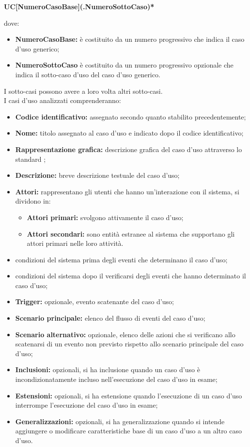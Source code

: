 \begin{center}
	\textbf{UC[NumeroCasoBase](.NumeroSottoCaso)*}
\end{center}
dove:
\begin{itemize}
	\item \textbf{NumeroCasoBase:} è costituito da un numero progressivo che indica il caso d'uso generico;
	\item \textbf{NumeroSottoCaso} è costituito da un numero progressivo opzionale che indica il sotto-caso d'uso del caso d'uso generico.
\end{itemize}  
I sotto-casi possono avere a loro volta altri sotto-casi.\\ 
I casi d'uso analizzati comprenderanno:
\begin{itemize}
	\item \textbf{Codice identificativo:} assegnato secondo quanto stabilito precedentemente;
	\item \textbf{Nome:} titolo assegnato al caso d'uso e indicato dopo il codice identificativo;
	\item \textbf{Rappresentazione grafica:} descrizione grafica del caso d'uso attraverso lo standard ;
	\item \textbf{Descrizione:} breve descrizione testuale del caso d'uso;
	\item \textbf{Attori:} rappresentano gli utenti che hanno un'interazione con il sistema, si dividono in:
	\begin{itemize}
		\item \textbf{Attori primari:} svolgono attivamente il caso d'uso;
		\item \textbf{Attori secondari:} sono entità estranee al sistema che supportano gli attori primari nelle loro attività.
	\end{itemize}
	\item {} condizioni del sistema prima degli eventi che determinano il caso d'uso;
	\item {} condizioni del sistema dopo il verificarsi degli eventi che hanno determinato il caso d'uso;
	\item \textbf{Trigger:} opzionale, evento scatenante del caso d'uso;
	\item \textbf{Scenario principale:} elenco del flusso di eventi del caso d'uso;
	\item \textbf{Scenario alternativo:} opzionale, elenco delle azioni che si verificano allo scatenarsi di un evento non previsto rispetto allo scenario principale del caso d'uso;
	\item \textbf{Inclusioni:} opzionali, si ha inclusione quando un caso d'uso è incondizionatamente incluso nell'esecuzione del caso d'uso in esame;
	\item \textbf{Estensioni:} opzionali, si ha estensione quando l'esecuzione di un caso d'uso interrompe l'esecuzione del caso d'uso in esame;
	\item \textbf{Generalizzazioni:} opzionali, si ha generalizzazione quando si intende aggiungere o modificare caratteristiche base di un caso d'uso a un altro caso d'uso.
\end{itemize}


